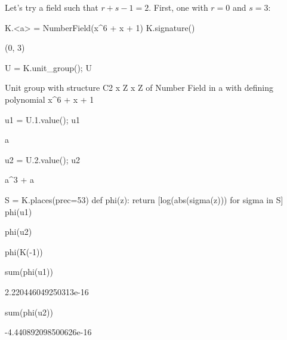 Let's try a field such that $r + s - 1 = 2$. First, one with $r=0$ and $s=3$:
\begin{sagecode}
\begin{sagecell}
K.<a> = NumberField(x^6 + x + 1)
K.signature()
\end{sagecell}
\begin{sageout}
(0, 3)
\end{sageout}
\begin{sagecell}
U = K.unit_group(); U
\end{sagecell}
\begin{sageout}
Unit group with structure C2 x Z x Z of Number Field in a with
defining polynomial x^6 + x + 1
\end{sageout}
\begin{sagecell}
u1 = U.1.value(); u1
\end{sagecell}
\begin{sageout}
a
\end{sageout}
\begin{sagecell}
u2 = U.2.value(); u2
\end{sagecell}
\begin{sageout}
a^3 + a
\end{sageout}
\begin{sagecell}
S = K.places(prec=53)
def phi(z):
return [log(abs(sigma(z))) for sigma in S]
phi(u1)
\end{sagecell}
\begin{sageout}
[-0.16741548328589614, 0.04864390975267338, 0.11877157353322298]
\end{sageout}
\begin{sagecell}
phi(u2)
\end{sagecell}
\begin{sageout}
[0.30678570892329504, -1.0725146505489758, 0.7657289416256803]
\end{sageout}
\begin{sagecell}
phi(K(-1))
\end{sagecell}
\begin{sageout}
[0.0, 0.0, 0.0]
\end{sageout}
\begin{sagecell}
sum(phi(u1))
\end{sagecell}
\begin{sageout}
2.220446049250313e-16
\end{sageout}
\begin{sagecell}
sum(phi(u2))
\end{sagecell}
\begin{sageout}
-4.440892098500626e-16
\end{sageout}
\end{sagecode}


